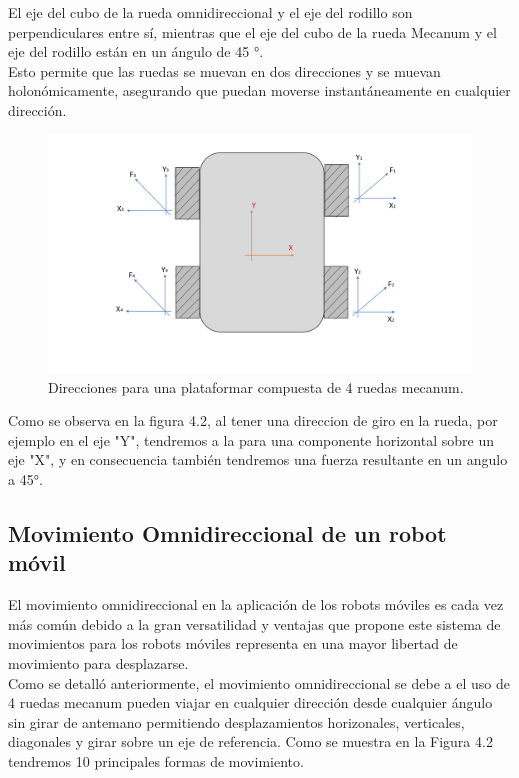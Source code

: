 \documentclass[12pt]{book} %
\begin{document}
El eje del cubo de la rueda omnidireccional y el eje del rodillo son perpendiculares entre sí, mientras que el eje del cubo de la rueda Mecanum y el eje del rodillo están en un ángulo de 45 °.\\
Esto permite que las ruedas se muevan en dos direcciones y se muevan holonómicamente, asegurando que puedan moverse instantáneamente en cualquier dirección.\\

\begin{figure}[H]
\centering
\includegraphics[scale=0.4]{Direcciones.pdf} 
\caption{Direcciones para una plataformar compuesta de 4 ruedas mecanum.} 
\end{figure}
Como se observa en la figura 4.2, al tener una direccion de giro en la rueda, por ejemplo en el eje "Y", tendremos a la para una componente horizontal sobre un eje "X", y en consecuencia también tendremos una fuerza resultante en un angulo a 45°.

	\subsection{Movimiento Omnidireccional de un robot móvil}

El movimiento omnidireccional en la aplicación de los robots móviles es cada vez más común debido a la gran versatilidad y ventajas que propone este sistema de movimientos para los robots móviles representa en una mayor libertad de movimiento para desplazarse.\\Como se detalló anteriormente, el movimiento omnidireccional se debe a el uso de 4 ruedas mecanum pueden viajar en cualquier dirección desde cualquier ángulo sin girar de antemano permitiendo desplazamientos horizonales, verticales, diagonales y girar sobre un eje de referencia. Como se muestra en la Figura 4.2 tendremos 10 principales formas de movimiento.\\
\end{document}
